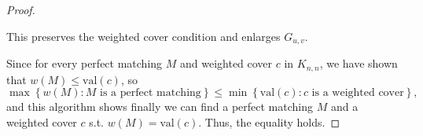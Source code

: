\begin{proof}
\begin{algorithm}[H]
{    This preserves the weighted cover condition and enlarges \(G_{u,v}\).
}
\end{algorithm}
Since for every perfect matching \(M\) and weighted cover \(c\) in \(K_{n, n}\), we have shown that \(w(M) \le \mathrm{val}(c) \), so
    \[
       \max \left\{ w(M): M \text{ is a perfect matching}  \right\} \le \min \left\{ \mathrm{val}(c): c \text{ is a weighted cover}   \right\},  
    \]      
    and this algorithm shows finally we can find a perfect matching \(M\) and a weighted cover \(c\) s.t. \(w(M) = \mathrm{val}(c) \). Thus, the equality holds.         
\end{proof}